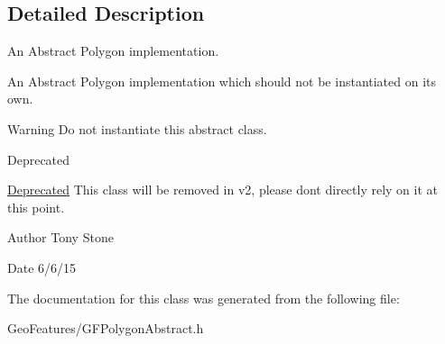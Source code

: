 \subsection{Detailed Description}
An Abstract Polygon implementation. 

An Abstract Polygon implementation which should not be instantiated on it\textquotesingle{}s own.

\begin{DoxyWarning}{Warning}
Do not instantiate this abstract class.
\end{DoxyWarning}
\begin{DoxyRefDesc}{Deprecated}
\item[\hyperlink{deprecated__deprecated000003}{Deprecated}]This class will be removed in v2, please don\textquotesingle{}t directly rely on it at this point.\end{DoxyRefDesc}


\begin{DoxyAuthor}{Author}
Tony Stone 
\end{DoxyAuthor}
\begin{DoxyDate}{Date}
6/6/15 
\end{DoxyDate}


The documentation for this class was generated from the following file\+:\begin{DoxyCompactItemize}
\item 
Geo\+Features/G\+F\+Polygon\+Abstract.\+h\end{DoxyCompactItemize}
